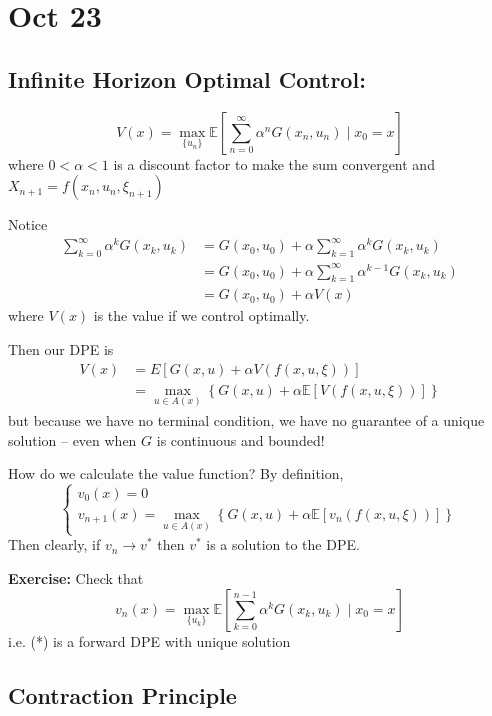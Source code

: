 \documentclass[12pt]{report}
\newcommand{\E}{\mathbb{E}}
\newenvironment*{exercise}[1][red]{
    \begin{tcolorbox}[
        parbox=false,
        colback=#1!5!white,
        colframe=#1!75!black,
        breakable
    ]}
    {\end{tcolorbox}}
\begin{document}
\section*{Oct 23}
\subsection*{Infinite Horizon Optimal Control:}
    \[V(x) = \max_{\{u_n\}} \E\left[\sum_{n=0}^\infty \alpha^n G(x_n, u_n) \; \bigg\vert \; x_0 = x \right]\]
    where $0 < \alpha < 1$ is a discount factor to make the sum convergent and $X_{n+1} = f(x_n, u_n, \xi_{n+1})$

    Notice 
    \begin{align*}
        \sum_{k=0}^\infty\alpha^k G(x_k, u_k) &= G(x_0, u_0) + \alpha \sum_{k=1}^\infty \alpha^{k} G(x_k, u_k)\\
        &= G(x_0, u_0) + \alpha \sum_{k=1}^\infty \alpha^{k-1} G(x_{k}, u_{k})\\
        &= G(x_0, u_0) + \alpha V(x)
    \end{align*}
    where $V(x)$ is the value if we control optimally.

    Then our DPE is 
    \begin{align*}
        V(x) &= E[G(x, u) + \alpha V(f(x, u, \xi))]\\ 
            &= \max_{u \in A(x)} \left\{G(x, u) + \alpha \E[V(f(x, u, \xi))]\right\}
    \end{align*}
    but because we have no terminal condition, we have no guarantee of a unique solution -- even when $G$ is continuous and bounded!
    
    How do we calculate the value function? By definition,
    \[\begin{cases}
        v_0(x) = 0\\ 
        v_{n+1}(x) = \max_{u \in A(x)} \left\{G(x, u) + \alpha \E[v_n(f(x, u, \xi))]\right\}
    \end{cases} \tag{*}\]
    Then clearly, if $v_n \to v^*$ then $v^*$ is a solution to the DPE.

    \begin{exercise}
        \textbf{Exercise:} Check that 
        \[v_n(x) = \max_{\{u_k\}} \E\left[\sum_{k=0}^{n-1} \alpha^k G(x_k, u_k) \; \bigg\vert \; x_0 = x\right]\]
        i.e. (*) is a forward DPE with unique solution
    \end{exercise}

\subsection*{Contraction Principle}
\end{document}
